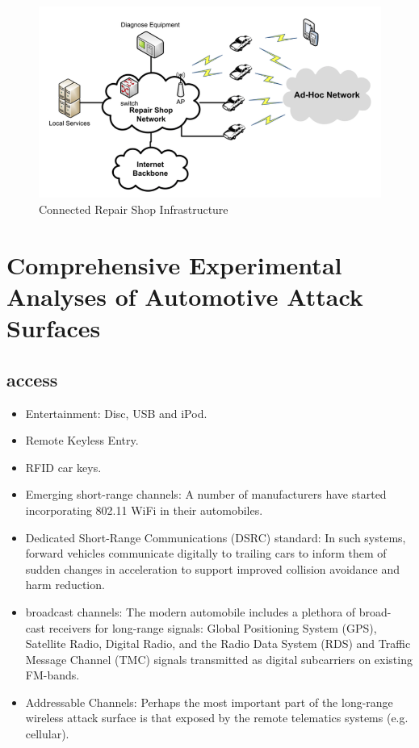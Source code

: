 \documentclass[11pt]{article}
\begin{document}
\begin{figure}[h]
	\caption{Connected Repair Shop Infrastructure}
	\label{fig:repshop}
	\centering
	\includegraphics[width=\textwidth]{repairshop}
\end{figure}

\section{Comprehensive Experimental Analyses of Automotive Attack Surfaces}

\subsection{access}

\begin{itemize}
	\item Entertainment: Disc, USB and iPod.
	\item Remote Keyless Entry.
	\item RFID car keys.
	\item Emerging short-range channels: A number of manufacturers have started incorporating 802.11 WiFi in their automobiles.
	\item Dedicated Short-Range Communications (DSRC) standard: In such systems, forward vehicles communicate digitally to trailing cars to inform them of sudden changes in acceleration to support improved collision avoidance and harm reduction.
	\item broadcast channels: The modern automobile includes a plethora of broad- cast receivers for long-range signals: Global Positioning System (GPS), Satellite Radio, Digital Radio, and the Radio Data System (RDS) and Traffic Message Channel (TMC) signals transmitted as digital subcarriers on existing FM-bands.
	\item Addressable Channels: Perhaps the most important part of the long-range wireless attack surface is that exposed by the remote telematics systems (e.g. cellular).
\end{itemize}
\end{document}
